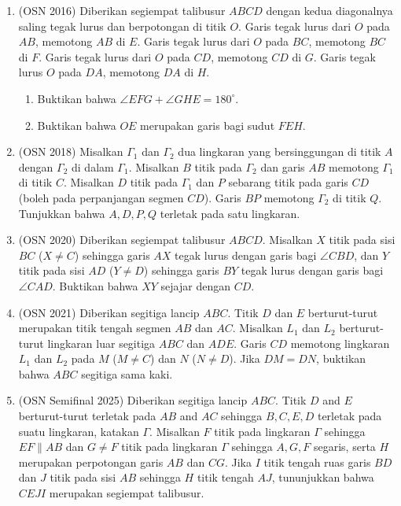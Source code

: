 \documentclass[12pt,a4paper]{article}
\begin{document}
\begin{enumerate}

\item (OSN 2016) Diberikan segiempat talibusur $ABCD$ dengan kedua diagonalnya saling tegak lurus dan berpotongan di titik $O$. Garis tegak lurus dari $O$ pada $AB$, memotong $AB$ di $E$. Garis tegak lurus dari $O$ pada $BC$, memotong $BC$ di $F$. Garis tegak lurus dari $O$ pada $CD$, memotong $CD$ di $G$. Garis tegak lurus $O$ pada $DA$, memotong $DA$ di $H$.
\begin{enumerate}
    \item[(a)] Buktikan bahwa $\angle EFG+\angle GHE=180^{\circ}$.
    \item[(b)] Buktikan bahwa $OE$ merupakan garis bagi sudut $FEH$.
\end{enumerate}

\item (OSN 2018) Misalkan $\Gamma_{1}$ dan $\Gamma_{2}$ dua lingkaran yang bersinggungan di titik $A$ dengan $\Gamma_{2}$ di dalam $\Gamma_{1}$. Misalkan $B$ titik pada $\Gamma_{2}$ dan garis $AB$ memotong $\Gamma_{1}$ di titik $C$. Misalkan $D$ titik pada $\Gamma_{1}$ dan $P$ sebarang titik pada garis $CD$ (boleh pada perpanjangan segmen $CD$). Garis $BP$ memotong $\Gamma_{2}$ di titik $Q$. Tunjukkan bahwa $A, D, P, Q$ terletak pada satu lingkaran.

\item (OSN 2020) Diberikan segiempat talibusur $ABCD$. Misalkan $X$ titik pada sisi $BC$ ($X \neq C$) sehingga garis $AX$ tegak lurus dengan garis bagi $\angle CBD$, dan $Y$ titik pada sisi $AD$ ($Y \neq D$) sehingga garis $BY$ tegak lurus dengan garis bagi $\angle CAD$. Buktikan bahwa $XY$ sejajar dengan $CD$.

\item (OSN 2021) Diberikan segitiga lancip $ABC$. Titik $D$ dan $E$ berturut-turut merupakan titik tengah segmen $AB$ dan $AC$. Misalkan $L_1$ dan $L_2$ berturut-turut lingkaran luar segitiga $ABC$ dan $ADE$. Garis $CD$ memotong lingkaran $L_1$ dan $L_2$ pada $M$ ($M \neq C$) dan $N$ ($N \neq D$). Jika $DM = DN$, buktikan bahwa $ABC$ segitiga sama kaki.

\item (OSN Semifinal 2025) Diberikan segitiga lancip $ABC$. Titik $D$ and $E$ berturut-turut terletak pada $AB$ and $AC$ sehingga $B, C, E, D$ terletak pada suatu lingkaran, katakan $\Gamma$. Misalkan $F$ titik pada lingkaran $\Gamma$ sehingga $EF \parallel AB$ dan $G\ne F$ titik pada lingkaran $\Gamma$ sehingga $A, G, F$ segaris, serta $H$ merupakan perpotongan garis $AB$ dan $CG$. Jika $I$ titik tengah ruas garis $BD$ dan $J$ titik pada sisi $AB$ sehingga $H$ titik tengah $AJ$, tununjukkan bahwa $CEJI$ merupakan segiempat talibusur.

\end{enumerate}
\end{document}
